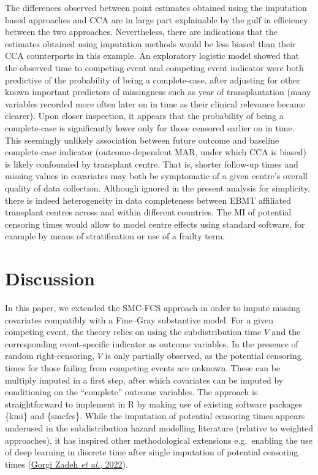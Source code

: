 \documentclass[
  letterpaper,
  DIV=11,
  numbers=noendperiod]{scrreprt}
\begin{document}
The differences observed between point estimates obtained using the
imputation based approaches and CCA are in large part explainable by the
gulf in efficiency between the two approaches. Nevertheless, there are
indications that the estimates obtained using imputation methods would
be less biased than their CCA counterparts in this example. An
exploratory logistic model showed that the observed time to competing
event and competing event indicator were both predictive of the
probability of being a complete-case, after adjusting for other known
important predictors of missingness such as year of transplantation
(many variables recorded more often later on in time as their clinical
relevance became clearer). Upon closer inspection, it appears that the
probability of being a complete-case is significantly lower only for
those censored earlier on in time. This seemingly unlikely association
between future outcome and baseline complete-case indicator
(outcome-dependent MAR, under which CCA is biased) is likely confounded
by transplant centre. That is, shorter follow-up times and missing
values in covariates may both be symptomatic of a given centre's overall
quality of data collection. Although ignored in the present analysis for
simplicity, there is indeed heterogeneity in data completeness between
EBMT affiliated transplant centres across and within different
countries. The MI of potential censoring times would allow to model
centre effects using standard software, for example by means of
stratification or use of a frailty term.

\hypertarget{sec-discussion}{%
\section{Discussion}\label{sec-discussion}}

In this paper, we extended the SMC-FCS approach in order to impute
missing covariates compatibly with a Fine--Gray substantive model. For a
given competing event, the theory relies on using the subdistribution
time \(V\) and the corresponding event-specific indicator as outcome
variables. In the presence of random right-censoring, \(V\) is only
partially observed, as the potential censoring times for those failing
from competing events are unknown. These can be multiply imputed in a
first step, after which covariates can be imputed by conditioning on the
``complete'' outcome variables. The approach is straightforward to
implement in R by making use of existing software packages \{kmi\} and
\{smcfcs\}. While the imputation of potential censoring times appears
underused in the subdistribution hazard modelling literature (relative
to weighted approaches), it has inspired other methodological extensions
e.g.~enabling the use of deep learning in discrete time after single
imputation of potential censoring times
(\protect\hyperlink{ref-gorgizadehImputationApproachUsing2022a}{Gorgi
Zadeh \emph{et al.}, 2022}).
\end{document}
